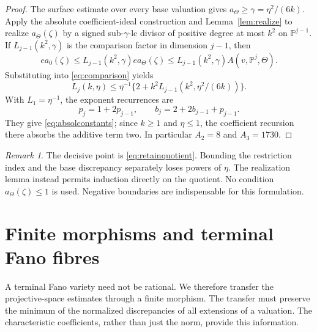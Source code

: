 \documentclass[11pt,reqno]{amsart}
\numberwithin{equation}{section}
\theoremstyle{definition}
\theoremstyle{remark}
\newtheorem{remark}[theorem]{Remark}
\newcommand{\PP}{\mathbb P}
\begin{document}
\begin{proof}
The surface estimate over every base valuation gives $a_\Theta\ge\gamma=\eta^2/(6k)$. Apply the absolute coefficient-ideal construction and Lemma~\ref{lem:realize} to realize $a_\Theta(\zeta)$ by a signed sub-$\gamma$-lc divisor of positive degree at most $k^2$ on $\PP^{j-1}$. If $L_{j-1}(k^2,\gamma)$ is the comparison factor in dimension $j-1$, then
\begin{equation}\label{eq:retainquotient}
 e a_0(\zeta)
 \le L_{j-1}(k^2,\gamma)e a_\Theta(\zeta)
 \le L_{j-1}(k^2,\gamma)A(v,\PP^j,\Theta).
\end{equation}
Substituting into \eqref{eq:comparison} yields
\[
 L_j(k,\eta)\le\eta^{-1}
 \{2+k^2L_{j-1}(k^2,\eta^2/(6k))\}.
\]
With $L_1=\eta^{-1}$, the exponent recurrences are
\[
 p_j=1+2p_{j-1},\qquad b_j=2+2b_{j-1}+p_{j-1}.
\]
They give \eqref{eq:absolconstants}; since $k\ge1$ and $\eta\le1$, the coefficient recursion there absorbs the additive term two. In particular $A_2=8$ and $A_3=1730$.
\end{proof}

\begin{remark}
The decisive point is \eqref{eq:retainquotient}. Bounding the restriction index and the base discrepancy separately loses powers of $\eta$. The realization lemma instead permits induction directly on the quotient. No condition $a_\Theta(\zeta)\le1$ is used. Negative boundaries are indispensable for this formulation.
\end{remark}

\section{Finite morphisms and terminal Fano fibres}\label{sec:finite}

A terminal Fano variety need not be rational. We therefore transfer the projective-space estimates through a finite morphism. The transfer must preserve the minimum of the normalized discrepancies of all extensions of a valuation. The characteristic coefficients, rather than just the norm, provide this information.
\end{document}
